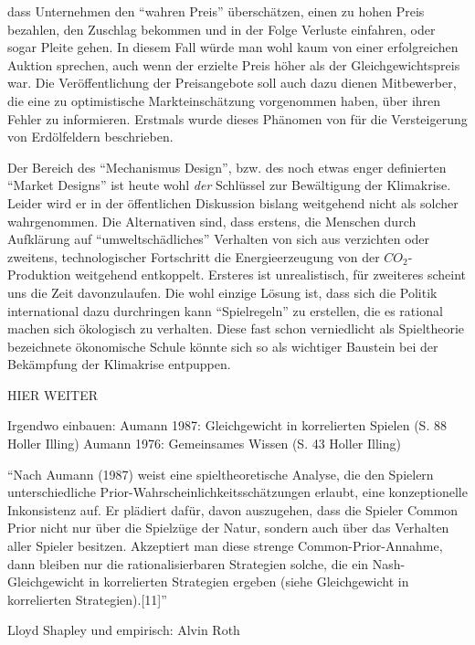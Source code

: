 dass Unternehmen den "`wahren Preis"' überschätzen, einen zu hohen Preis bezahlen, den Zuschlag bekommen und in der Folge Verluste einfahren, oder sogar Pleite gehen. In diesem Fall würde man wohl kaum von einer erfolgreichen Auktion sprechen, auch wenn der erzielte Preis höher als der Gleichgewichtspreis war. Die Veröffentlichung der Preisangebote soll auch dazu dienen Mitbewerber, die eine zu optimistische Markteinschätzung vorgenommen haben, über ihren Fehler zu informieren. Erstmals wurde dieses Phänomen von \textcite{Capen1971} für die Versteigerung von Erdölfeldern beschrieben.

Der Bereich des "`Mechanismus Design"', bzw. des noch etwas enger definierten "`Market Designs"' ist heute wohl \textit{der} Schlüssel zur Bewältigung der Klimakrise. Leider wird er in der öffentlichen Diskussion bislang weitgehend nicht als solcher wahrgenommen. Die Alternativen sind, dass erstens, die Menschen durch Aufklärung auf "`umweltschädliches"' Verhalten von sich aus verzichten oder zweitens, technologischer Fortschritt die Energieerzeugung von der $CO_2$-Produktion weitgehend entkoppelt. Ersteres ist unrealistisch, für zweiteres scheint uns die Zeit davonzulaufen. Die wohl einzige Lösung ist, dass sich die Politik international dazu durchringen kann "`Spielregeln"' zu erstellen, die es rational machen sich ökologisch zu verhalten. Diese fast schon verniedlicht als Spieltheorie bezeichnete ökonomische Schule könnte sich so als wichtiger Baustein bei der Bekämpfung der Klimakrise entpuppen.



HIER WEITER 

Irgendwo einbauen: 
Aumann 1987: Gleichgewicht in korrelierten Spielen (S. 88 Holler Illing) Aumann 1976: Gemeinsames Wissen (S. 43 Holler Illing)


"`Nach Aumann (1987) weist eine spieltheoretische Analyse, die den Spielern unterschiedliche Prior-Wahrscheinlichkeitsschätzungen erlaubt, eine konzeptionelle Inkonsistenz auf. Er plädiert dafür, davon auszugehen, dass die Spieler Common Prior nicht nur über die Spielzüge der Natur, sondern auch über das Verhalten aller Spieler besitzen. Akzeptiert man diese strenge Common-Prior-Annahme, dann bleiben nur die rationalisierbaren Strategien solche, die ein Nash-Gleichgewicht in korrelierten Strategien ergeben (siehe Gleichgewicht in korrelierten Strategien).[11]"'



Lloyd Shapley und empirisch: Alvin Roth

